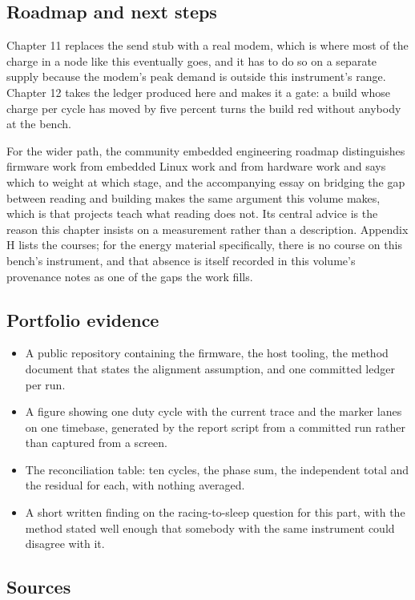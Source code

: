 \subsection*{Roadmap and next steps}

Chapter 11 replaces the send stub with a real modem, which is where most of the
charge in a node like this eventually goes, and it has to do so on a separate
supply because the modem's peak demand is outside this instrument's range.
Chapter 12 takes the ledger produced here and makes it a gate: a build whose
charge per cycle has moved by five percent turns the build red without anybody
at the bench.

For the wider path, the community embedded engineering roadmap distinguishes
firmware work from embedded Linux work and from hardware work and says which to
weight at which stage, and the accompanying essay on bridging the gap between
reading and building makes the same argument this volume makes, which is that
projects teach what reading does not. Its central advice is the reason this
chapter insists on a measurement rather than a description. Appendix H lists the
courses; for the energy material specifically, there is no course on this bench's
instrument, and that absence is itself recorded in this volume's provenance notes
as one of the gaps the work fills.

\subsection*{Portfolio evidence}

\begin{itemize}
\item A public repository containing the firmware, the host tooling, the method
document that states the alignment assumption, and one committed ledger per run.
\item A figure showing one duty cycle with the current trace and the marker lanes
on one timebase, generated by the report script from a committed run rather than
captured from a screen.
\item The reconciliation table: ten cycles, the phase sum, the independent total
and the residual for each, with nothing averaged.
\item A short written finding on the racing-to-sleep question for this part, with
the method stated well enough that somebody with the same instrument could
disagree with it.
\end{itemize}

\subsection*{Sources}

